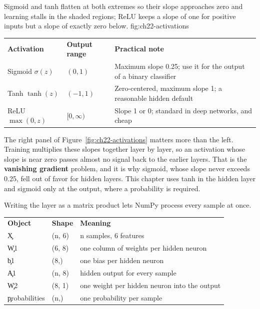 
{Sigmoid and tanh flatten at both extremes so their slope approaches zero and learning stalls in the shaded regions; ReLU keeps a slope of one for positive inputs but a slope of exactly zero below.}
{fig:ch22-activations}

\begin{center}
\begin{tabular}{lll}
\textbf{Activation} & \textbf{Output range} & \textbf{Practical note} \\
Sigmoid $\sigma(z)$ & $(0, 1)$ & Maximum slope 0.25; use it for the output of a binary classifier \\
Tanh $\tanh(z)$ & $(-1, 1)$ & Zero-centered, maximum slope 1; a reasonable hidden default \\
ReLU $\max(0, z)$ & $[0, \infty)$ & Slope 1 or 0; standard in deep networks, and cheap \\
\end{tabular}
\end{center}

The right panel of Figure~\ref{fig:ch22-activations} matters more than the left.
Training multiplies these slopes together layer by layer, so an activation whose
slope is near zero passes almost no signal back to the earlier layers. That is
the \textbf{vanishing gradient} problem, and it is why sigmoid, whose slope never
exceeds 0.25, fell out of favor for hidden layers. This chapter uses tanh in the
hidden layer and sigmoid only at the output, where a probability is required.


Writing the layer as a matrix product lets NumPy process every sample at once.

\begin{center}
\begin{tabular}{lll}
\textbf{Object} & \textbf{Shape} & \textbf{Meaning} \\
\c{X} & (n, 6) & n samples, 6 features \\
\c{W1} & (6, 8) & one column of weights per hidden neuron \\
\c{b1} & (8,) & one bias per hidden neuron \\
\c{A1} & (n, 8) & hidden output for every sample \\
\c{W2} & (8, 1) & one weight per hidden neuron into the output \\
\c{probabilities} & (n,) & one probability per sample \\
\end{tabular}
\end{center}

